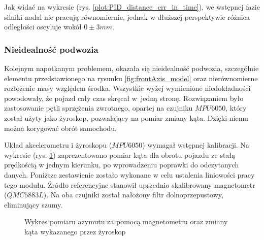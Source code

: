             Jak widać na wykresie (rys. \ref{plot:PID_distance_err_in_time}), we wstępnej fazie silniki nadal nie pracują równomiernie, jednak w dłuższej perspektywie różnica odległości oscyluje wokół  $ 0\pm 3mm$.

    \subsubsection{Nieidealność podwozia}
        Kolejnym napotkanym problemem, okazała się nieidealność podwozia,
        szczególnie elementu przedstawionego na rysunku \ref{fig:frontAxis_model} oraz nierównomierne rozłożenie masy względem środka.
        Wszystkie wyżej wymienione niedokładności powodowały, że pojazd cały czas skręcał w~jedną stronę.
        Rozwiązaniem było zastosowanie pętli sprzężenia zwrotnego, opartej na czujniku $MPU6050$, który został użyty jako żyroskop, pozwalający na pomiar zmiany kąta.
        Dzięki niemu można korygować obrót samochodu.

        Układ akcelerometru i żyroskopu ($MPU6050$) wymagał wstępnej kalibracji.
        Na wykresie (rys. \ref{plot:gyro_magneto_measure}) zaprezentowano pomiar kąta dla obrotu pojazdu ze stałą prędkością w jednym kierunku, po wprowadzeniu poprawki do odczytanych danych.
        Poniższe zestawienie zostało wykonane w celu ustalenia liniowości pracy tego modułu.
        Źródło referencyjne stanowił uprzednio skalibrowany magnetometr ($QMC5883L$).
        Na oba czujniki został nałożony filtr dolnoprzepustowy, eliminujący szumy.

        \begin{figure}[!ht]
            \centering
                \caption{Wykres pomiaru azymutu za pomocą magnetometru oraz zmiany kąta wykazanego przez żyroskop}
                \label{plot:gyro_magneto_measure}
        \end{figure}

